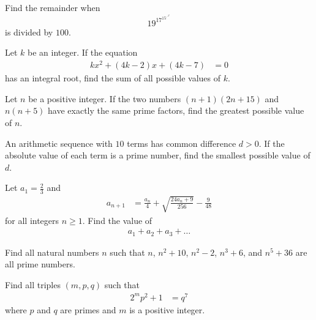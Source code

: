 \begin{problem}
	Find the remainder when $$19^{17^{15^{\iddots^{3^{1}}}}}$$ is divided by $100$.
\end{problem}

\begin{problem}
	Let $k$ be an integer. If the equation
		\begin{align*}
			kx^2 + (4k - 2)x + (4k - 7)
				& = 0
		\end{align*}
	has an integral root, find the sum of all possible values of $k$.
\end{problem}

\begin{problem}
	Let $n$ be a positive integer. If the two numbers $(n + 1)(2n + 15)$ and $n(n + 5)$ have exactly the same prime factors, find the greatest possible value of $n$.
\end{problem}

\begin{problem}
	An arithmetic sequence with $10$ terms has common difference $d > 0$. If the absolute value of each term is a prime number, find the smallest possible value of $d$.
\end{problem}

\begin{problem}
	Let $a_1 = \frac{2}{3}$ and
		\begin{align*}
			a_{n+1}
				&= \frac{a_n}{4} + \sqrt{\frac{24a_n+9}{256}} - \frac{9}{48}
		\end{align*}
	for all integers $n \geq 1$. Find the value of
		\begin{align*}
			a_1+a_2+a_3+\dots
		\end{align*}
\end{problem}

\begin{problem}
	Find all natural numbers $n$ such that $n$, $n^2+10$, $n^2-2$, $n^3+6$, and $n^5+36$ are all prime numbers. %
\end{problem}

\begin{problem}
	Find all triples $(m,p,q)$ such that
		\begin{align*}
			2^mp^2 +1
				& = q^7
		\end{align*}
	where $p$ and $q$ are primes and $m$ is a positive integer. %
\end{problem}

